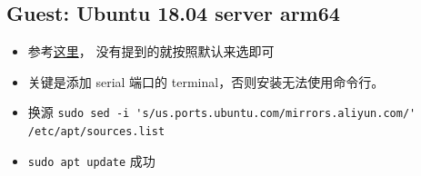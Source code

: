 
\subsection{Guest: Ubuntu 18.04 server arm64}
\begin{itemize}
\item 参考\href{https://www.machunjie.com/linux/1570.html}{这里}， 没有提到的就按照默认来选即可
\item 关键是添加 serial 端口的 terminal，否则安装无法使用命令行。
\item 换源 \verb`sudo sed -i 's/us.ports.ubuntu.com/mirrors.aliyun.com/' /etc/apt/sources.list`
\item \verb`sudo apt update` 成功
\end{itemize}
